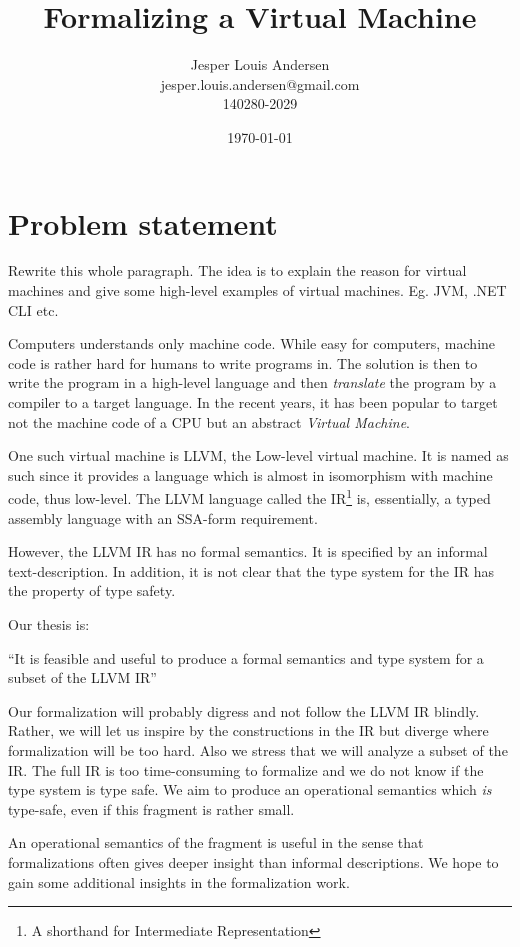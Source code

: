 \documentclass[a4paper, oneside, 10pt, draft]{memoir}
\author{Jesper Louis
  Andersen\\jesper.louis.andersen@gmail.com\\140280-2029}
\title{Formalizing a Virtual Machine}
\date{\today}
\begin{document}
\maketitle{}
\listoffixmes{}
\chapter*{Problem statement}

\begin{afixme}
  Rewrite this whole paragraph. The idea is to explain the reason for
  virtual machines and give some high-level examples of virtual
  machines. Eg. JVM, .NET CLI etc.
\end{afixme}
Computers understands only machine code. While easy for computers,
machine code is rather hard for humans to write programs in. The
solution is then to write the program in a high-level language and
then \emph{translate} the program by a compiler to a target
language. In the recent years, it has been popular to target not the
machine code of a CPU but an abstract \emph{Virtual Machine}.

One such virtual machine is LLVM, the Low-level virtual machine. It is
named as such since it provides a language which is almost in
isomorphism with machine code, thus low-level. The LLVM language
called the IR\footnote{A shorthand for Intermediate Representation}
is, essentially, a typed assembly language with an
SSA-form\cite{appel:1998:modern} requirement.

However, the LLVM IR has no formal semantics. It is specified by an
informal text-description. In addition, it is not clear that the type
system for the IR has the property of type safety\cite{pierce:2002:types}.

Our thesis is:

``It is feasible and useful to produce a formal semantics and type
system for a subset of the LLVM IR''

Our formalization will probably digress and not follow the LLVM IR
blindly. Rather, we will let us inspire by the constructions in the IR
but diverge where formalization will be too hard. Also we stress that
we will analyze a subset of the IR. The full IR is too time-consuming
to formalize and we do not know if the type system is type safe. We
aim to produce an operational semantics which \emph{is} type-safe,
even if this fragment is rather small.

An operational semantics of the fragment is useful in the sense that
formalizations often gives deeper insight than informal
descriptions. We hope to gain some additional insights in the
formalization work.
\end{document}
